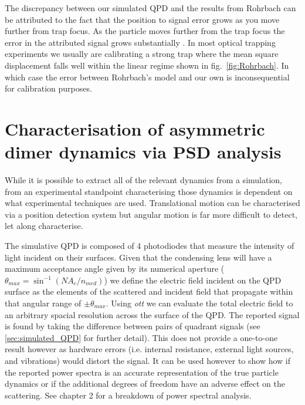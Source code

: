 The discrepancy between our simulated QPD and the results 
from Rohrbach can be attributed to the fact that the position 
to signal error grows as you move further from trap focus. 
As the particle moves further from the trap focus the error 
in the attributed signal grows substantially \cite{Rohrbach2002}.
In most optical trapping experiments we usually are calibrating 
a strong trap where the mean square displacement falls well within 
the linear regime shown in fig.~\ref{fig:Rohrbach}. In which case 
the error between Rohrbach's model and our own is inconsequential 
for calibration purposes. 

\section{Characterisation of asymmetric dimer dynamics via PSD analysis}
While it is possible to extract all of the relevant dynamics from a simulation, from an experimental standpoint characterising those 
dynamics is dependent on what experimental techniques are used. 
Translational motion can be characterised via a position detection 
system but angular motion is far more difficult to detect, let along characterise. 

The simulative QPD is composed of 4 photodiodes that measure the 
intensity of light incident on their surfaces. Given that the 
condensing lens will have a maximum acceptance angle given by 
its numerical aperture ($\theta_{max} = \sin^{-1}\left(NA_c/n_
{med}\right)$) we define the electric field incident on the QPD 
surface as the elements of the scattered and incident field that 
propagate within that angular range of $\pm \theta_{max}$. Using 
\textit{ott} we can evaluate the total electric field to an 
arbitrary spacial resolution across the surface of the QPD. The 
reported signal is found by taking the difference between pairs 
of quadrant signals (see \ref{sec:simulated_QPD} for further 
detail). This does not provide a one-to-one result however as 
hardware errors (i.e. internal resistance, external light sources, 
and vibrations) would distort the signal. It can be used however to 
show how if the reported power spectra is an accurate representation 
of the true particle dynamics or if the additional degrees of freedom 
have an adverse effect on the scattering. See chapter 2 for a breakdown
of power spectral analysis. 

